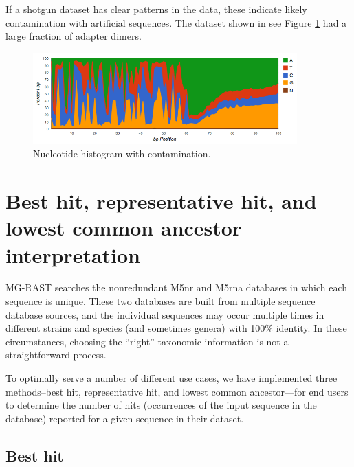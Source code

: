 \documentclass[12pt,fullpage]{report}
\begin{document}
If a shotgun dataset has clear patterns in the data, these indicate likely contamination with artificial sequences.
The dataset shown in see Figure \ref{fig:nucleotide-with-contamination} had a large fraction of adapter dimers.

\begin{figure}
\begin{center}
\includegraphics[width=4in]{Images/nucleotide-with-contamination.png}
\end{center}
\caption{
Nucleotide histogram with contamination.
}
\label{fig:nucleotide-with-contamination}
\end{figure}
\section{Best hit, representative hit, and lowest common ancestor interpretation}
\label{section:hit-types}

MG-RAST searches the nonredundant M5nr and M5rna databases in which each sequence is unique. These two databases are built from multiple sequence database sources, and the individual sequences may occur multiple times in different strains and species (and sometimes genera) with 100\% identity. In these circumstances, choosing the ``right'' taxonomic information is not a straightforward process.

To optimally serve a number of different use cases, we have implemented three methods--best hit, representative hit, and lowest common ancestor---for 
end users to determine the number of hits
(occurrences of the input sequence in the database)
reported for a given sequence in their dataset.
\subsection{Best hit}
\end{document}
